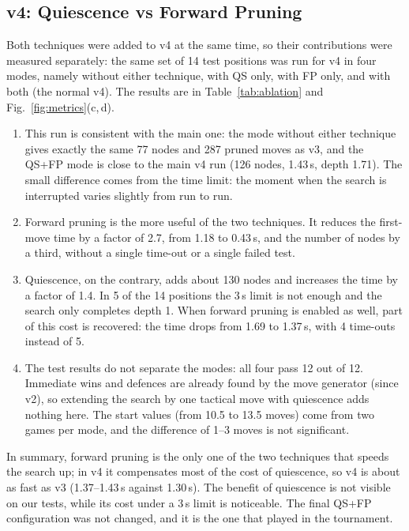 \documentclass[a4paper,10pt,twocolumn]{article}
\newenvironment{points}{\begin{enumerate}[label=(\arabic*),leftmargin=*,itemsep=2pt,topsep=3pt]}{\end{enumerate}}
\begin{document}
\subsection{v4: Quiescence vs Forward Pruning}\label{sec:ablation}
Both techniques were added to v4 at the same time, so their contributions were measured separately: the same set of 14 test positions was run for v4 in four modes, namely without either technique, with QS only, with FP only, and with both (the normal v4). The results are in Table~\ref{tab:ablation} and Fig.~\ref{fig:metrics}(c,\,d).
\begin{points}
\item This run is consistent with the main one: the mode without either technique gives exactly the same 77 nodes and 287 pruned moves as v3, and the QS+FP mode is close to the main v4 run (126 nodes, 1.43\,s, depth 1.71). The small difference comes from the time limit: the moment when the search is interrupted varies slightly from run to run.
\item Forward pruning is the more useful of the two techniques. It reduces the first-move time by a factor of 2.7, from 1.18 to 0.43\,s, and the number of nodes by a third, without a single time-out or a single failed test.
\item Quiescence, on the contrary, adds about 130 nodes and increases the time by a factor of 1.4. In 5 of the 14 positions the 3\,s limit is not enough and the search only completes depth 1. When forward pruning is enabled as well, part of this cost is recovered: the time drops from 1.69 to 1.37\,s, with 4 time-outs instead of 5.
\item The test results do not separate the modes: all four pass 12 out of 12. Immediate wins and defences are already found by the move generator (since v2), so extending the search by one tactical move with quiescence adds nothing here. The start values (from 10.5 to 13.5 moves) come from two games per mode, and the difference of 1--3 moves is not significant.
\end{points}
In summary, forward pruning is the only one of the two techniques that speeds the search up; in v4 it compensates most of the cost of quiescence, so v4 is about as fast as v3 (1.37--1.43\,s against 1.30\,s). The benefit of quiescence is not visible on our tests, while its cost under a 3\,s limit is noticeable. The final QS+FP configuration was not changed, and it is the one that played in the tournament.
\end{document}
